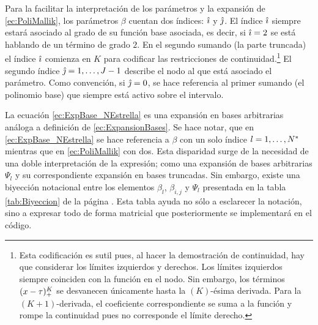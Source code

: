 \documentclass[../Main/Main.tex]{subfiles}
\begin{document}
Para la facilitar la interpretación de los parámetros y la expansión de \eqref{ec:PoliMallik}, los parámetros $\beta$ cuentan dos índices: $\hat{\imath}$ y $\hat{\jmath}$. El índice $\hat{\imath}$ siempre estará asociado al grado de su función base asociada, es decir, si $\hat{\imath} = 2$ se está hablando de un término de grado $2$. En el segundo sumando (la parte truncada) el índice $\hat{\imath}$ comienza en $K$ para codificar las restricciones de continuidad.\footnote{Esta codificación es sutil pues, al hacer la demostración de continuidad, hay que considerar los límites izquierdos y derechos. Los límites izquierdos siempre coinciden con la función en el nodo. Sin embargo, los términos $(x-\tau)^K_+$ se desvanecen únicamente hasta la $(K)$-ésima derivada. Para la $(K+1)$-derivada, el coeficiente correspondiente se suma a la función y rompe la continuidad pues no corresponde el límite derecho.} El segundo índice $\hat{\jmath} = 1,\ldots, J-1$ describe el nodo al que está asociado el parámetro. Como convención, si $\hat{\jmath} = 0$, se hace referencia al primer sumando (el polinomio base) que siempre está activo sobre el intervalo. 

La ecuación \eqref{ec:ExpBase_NEstrella} es una expansión en bases arbitrarias análoga a definición de \eqref{ec:ExpansionBases}. Se hace notar, que en \eqref{ec:ExpBase_NEstrella} se hace referencia a $\beta$ con un solo índice $l = 1,\ldots,N^*$ mientras que en \eqref{ec:PoliMallik} con dos. Esta disparidad surge de la necesidad de una doble interpretación de la expresión; como una expansión de bases arbitrarias $\Psi_l$ y su correspondiente expansión en bases truncadas. Sin embargo, existe una biyección notacional entre los elementos $\beta_l$, $\beta_{i,j}$ y $\Psi_l$ presentada en la tabla \ref{tab:Biyeccion} de la página \pageref{tab:Biyeccion}. Esta tabla ayuda no sólo a esclarecer la notación, sino a expresar todo de forma matricial que posteriormente se implementará en el código. 
\end{document}
